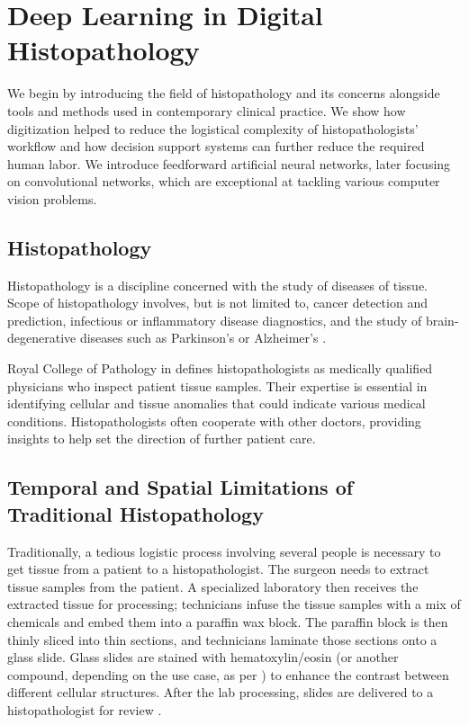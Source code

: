 \chapter{Deep Learning in Digital Histopathology}

We begin by introducing the field of histopathology and its concerns alongside tools and methods used in contemporary clinical practice.
We show how digitization helped to reduce the logistical complexity of histopathologists' workflow and how decision support systems can further reduce the required human labor.
We introduce feedforward artificial neural networks, later focusing on convolutional networks, which are exceptional at tackling various computer vision problems.

\section{Histopathology}

Histopathology is a discipline concerned with the study of diseases of tissue.
Scope of histopathology involves, but is not limited to, cancer detection and prediction, infectious or inflammatory disease diagnostics, and the study of brain-degenerative diseases such as Parkinson's or Alzheimer's \cite{histopathology-cancer, histopathology-infectious, histopathology-inflammatory, histopathology-brain-degenerative}.

Royal College of Pathology in \cite{histopathologist-role} defines histopathologists as medically qualified physicians who inspect patient tissue samples.
Their expertise is essential in identifying cellular and tissue anomalies that could indicate various medical conditions.
Histopathologists often cooperate with other doctors, providing insights to help set the direction of further patient care.

\section{Temporal and Spatial Limitations of Traditional Histopathology}

Traditionally, a tedious logistic process involving several people is necessary to get tissue from a patient to a histopathologist.
The surgeon needs to extract tissue samples from the patient.
A specialized laboratory then receives the extracted tissue for processing; technicians infuse the tissue samples with a mix of chemicals and embed them into a paraffin wax block.
The paraffin block is then thinly sliced into thin sections, and technicians laminate those sections onto a glass slide.
Glass slides are stained with hematoxylin/eosin (or another compound, depending on the use case, as per \cite{histopathology-staining}) to enhance the contrast between different cellular structures.
After the lab processing, slides are delivered to a histopathologist for review \cite{histo-process}.

